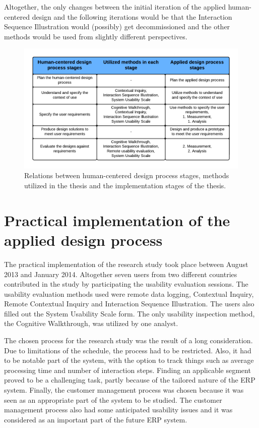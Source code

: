 \documentclass[12pt,a4paper,oneside,pdftex]{report}
\begin{document}
Altogether, the only changes between the initial iteration of the applied human-centered design and the following iterations would be that the Interaction Sequence Illustration would (possibly) get decommissioned and the other methods would be used from slightly different perspectives. 

\begin{figure}[H]
  	\centering
    	\includegraphics[width=1.0\textwidth]{./images/applied_hcd_process.png}
  	\caption{Relations between human-centered design process stages, methods utilized in the thesis and the implementation stages of the thesis.}
	\label{fig:hcd_process}
\end{figure}

\section{Practical implementation of the applied design process}
 \label{sec:implementation}

    
The practical implementation of the research study took place between August 2013 and January 2014. Altogether seven users from two different countries contributed in the study by participating the usability evaluation sessions. The usability evaluation methods used were remote data logging, Contextual Inquiry, Remote Contextual Inquiry and Interaction Sequence Illustration. The users also filled out the System Usability Scale form. The only usability inspection method, the Cognitive Walkthrough, was utilized by one analyst. 

The chosen process for the research study was the result of a long consideration. Due to limitations of the schedule, the process had to be restricted. Also, it had to be notable part of the system, with the option to track things such as average processing time and number of interaction steps. Finding an applicable segment proved to be a challenging task, partly because of the tailored nature of the ERP system. Finally, the customer management process was chosen because it was seen as an appropriate part of the system to be studied. The customer management process also had some anticipated usability issues and it was considered as an important part of the future ERP system.
\end{document}
